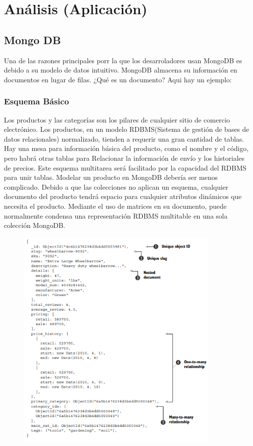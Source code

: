 \documentclass[preprint,12pt]{elsarticle}
\begin{document}

\section{Análisis (Aplicación)}

\subsection {\textbf{Mongo DB}}
Una de las razones principales porr la que los desarroladores usan MongoDB es debido a su modelo de datos intuitivo. MongoDB almacena su información en documentos en lugar de filas. ¿Qué es un documento? Aqui hay un ejemplo:
\subsubsection{\textbf{Esquema Básico}}
Los productos y las categorías son los pilares de cualquier sitio de comercio electrónico. Los productos, en un modelo RDBMS(Sistema de gestión de bases de datos relacionales) normalizado, tienden a requerir una gran cantidad de tablas. Hay una mesa para
información básica del producto, como el nombre y el código, pero habrá otras tablas para
Relacionar la información de envío y los historiales de precios. Este esquema multitarea será facilitado por la capacidad del RDBMS para unir tablas.
 Modelar un producto en MongoDB debería ser menos complicado. Debido a que las colecciones no aplican un esquema, cualquier documento del producto tendrá espacio para cualquier
atributos dinámicos que necesita el producto. Mediante el uso de matrices en su documento, puede
normalmente condensa una representación RDBMS multitable en una sola colección MongoDB.
\begin{figure}[htb]
	\begin{center}
		\includegraphics[width=10cm]{./IMAGENES/mongodb1} %
	\end{center}
\end{figure}
\end{document}
